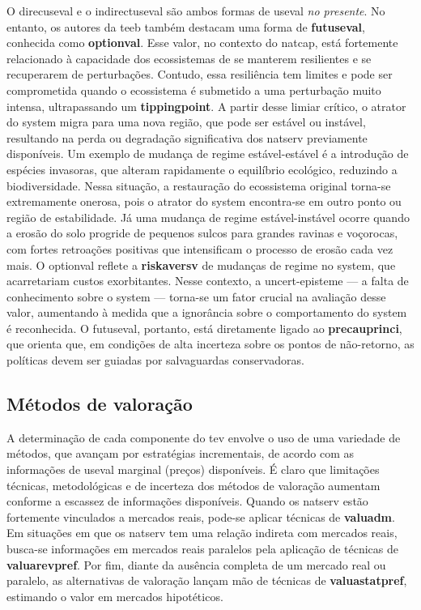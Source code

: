 \documentclass[./main.tex]{subfiles}
\begin{document}
\par O \gls{direcuseval} e o \gls{indirectuseval} são ambos formas de \gls{useval} \textit{no presente}. No entanto, os autores da \acrshort{teeb} também destacam uma forma de \textbf{\gls{futuseval}}, conhecida como \textbf{\gls{optionval}}. Esse valor, no contexto do \gls{natcap}, está fortemente relacionado à capacidade dos ecossistemas de se manterem resilientes e se recuperarem de perturbações. Contudo, essa resiliência tem limites e pode ser comprometida quando o ecossistema é submetido a uma perturbação muito intensa, ultrapassando um \textbf{\gls{tippingpoint}}. A partir desse limiar crítico, o atrator do \gls{system} migra para uma nova região, que pode ser estável ou instável, resultando na perda ou degradação significativa dos \gls{natserv} previamente disponíveis. Um exemplo de mudança de regime estável-estável é a introdução de espécies invasoras, que alteram rapidamente o equilíbrio ecológico, reduzindo a biodiversidade. Nessa situação, a restauração do ecossistema original torna-se extremamente onerosa, pois o atrator do \gls{system} encontra-se em outro ponto ou região de estabilidade. Já uma mudança de regime estável-instável ocorre quando a erosão do solo progride de pequenos sulcos para grandes ravinas e voçorocas, com fortes retroações positivas que intensificam o processo de erosão cada vez mais. O \gls{optionval} reflete a \textbf{\gls{riskaversv}} de mudanças de regime no \gls{system}, que acarretariam custos exorbitantes. Nesse contexto, a \gls{uncert-episteme} — a falta de conhecimento sobre o \gls{system} — torna-se um fator crucial na avaliação desse valor, aumentando à medida que a ignorância sobre o comportamento do \gls{system} é reconhecida. O \gls{futuseval}, portanto, está diretamente ligado ao \textbf{\gls{precauprinci}}, que orienta que, em condições de alta incerteza sobre os pontos de não-retorno, as políticas devem ser guiadas por salvaguardas conservadoras.

\subsection{Métodos de valoração} \label{sec:natserv:valuemethos}

\par A determinação de cada componente do \gls{tev} envolve o uso de uma variedade de métodos, que avançam por estratégias incrementais, de acordo com as informações de \gls{useval} marginal (preços) disponíveis. É claro que limitações técnicas, metodológicas e de incerteza dos métodos de valoração aumentam conforme a escassez de informações disponíveis. Quando os \gls{natserv} estão fortemente vinculados a mercados reais, pode-se aplicar técnicas de \textbf{\gls{valuadm}}. Em situações em que os \gls{natserv} tem uma relação indireta com mercados reais, busca-se informações em mercados reais paralelos pela aplicação de técnicas de \textbf{\gls{valuarevpref}}. Por fim, diante da ausência completa de um mercado real ou paralelo, as alternativas de valoração lançam mão de técnicas de \textbf{\gls{valuastatpref}}, estimando o valor em mercados hipotéticos.
\end{document}
